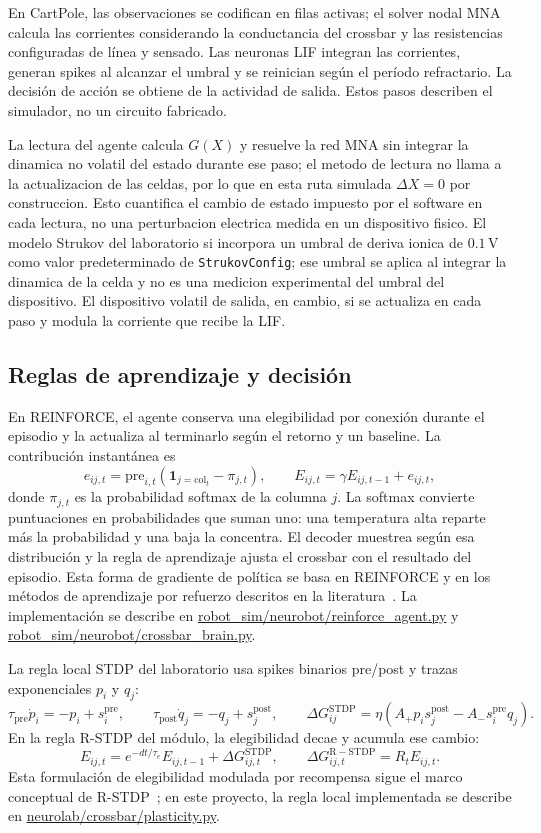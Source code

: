En CartPole, las observaciones se codifican en filas activas; el solver
nodal MNA calcula las corrientes considerando la conductancia del crossbar
y las resistencias configuradas de l\'inea y sensado. Las neuronas LIF
integran las corrientes, generan spikes al alcanzar el umbral y se reinician
seg\'un el per\'iodo refractario. La decisi\'on de acci\'on se obtiene de la
actividad de salida. Estos pasos describen el simulador, no un circuito
fabricado.

La lectura del agente calcula $G(X)$ y resuelve la red MNA sin integrar la
dinamica no volatil del estado durante ese paso; el metodo de lectura no
llama a la actualizacion de las celdas, por lo que en esta ruta simulada
$\Delta X=0$ por construccion. Esto cuantifica el cambio de estado impuesto
por el software en cada lectura, no una perturbacion electrica medida en un
dispositivo fisico. El modelo Strukov del laboratorio si incorpora un
umbral de deriva ionica de $0.1\,\mathrm{V}$ como valor predeterminado
de \texttt{StrukovConfig}; ese umbral se aplica al integrar la dinamica de la celda y no es una medicion
experimental del umbral del dispositivo. El dispositivo volatil de salida,
en cambio, si se actualiza en cada paso y modula la corriente que recibe
la LIF.

\subsection{Reglas de aprendizaje y decisi\'on}

En REINFORCE, el agente conserva una elegibilidad por conexi\'on durante el
episodio y la actualiza al terminarlo seg\'un el retorno y un baseline. La
contribuci\'on instant\'anea es
\[
e_{ij,t}=\mathrm{pre}_{i,t}
\left(\mathbf{1}_{j=\mathrm{col}_t}-\pi_{j,t}\right),\qquad
E_{ij,t}=\gamma E_{ij,t-1}+e_{ij,t},
\]
donde $\pi_{j,t}$ es la probabilidad softmax de la columna $j$. La softmax
convierte puntuaciones en probabilidades que suman uno: una temperatura alta
reparte m\'as la probabilidad y una baja la concentra. El decoder muestrea
seg\'un esa distribuci\'on y la regla de aprendizaje ajusta el crossbar con el
resultado del episodio. Esta forma de gradiente de pol\'itica se basa en REINFORCE y en los m\'etodos
de aprendizaje por refuerzo descritos en la literatura~\cite{Williams1992REINFORCE,SuttonBarto2018}. La implementaci\'on se describe en
\url{robot_sim/neurobot/reinforce_agent.py} y
\url{robot_sim/neurobot/crossbar_brain.py}.

La regla local STDP del laboratorio usa spikes binarios pre/post y trazas
exponenciales $p_i$ y $q_j$:
\[
\tau_{\mathrm{pre}}\dot p_i=-p_i+s_i^{\mathrm{pre}},\qquad
\tau_{\mathrm{post}}\dot q_j=-q_j+s_j^{\mathrm{post}},\qquad
\Delta G_{ij}^{\mathrm{STDP}}=\eta\left(A_+p_i s_j^{\mathrm{post}}
-A_-s_i^{\mathrm{pre}}q_j\right).
\]
En la regla R-STDP del m\'odulo, la elegibilidad decae y acumula ese cambio:
\[
E_{ij,t}=e^{-dt/\tau_e}E_{ij,t-1}+\Delta G_{ij,t}^{\mathrm{STDP}},
\qquad \Delta G_{ij,t}^{\mathrm{R-STDP}}=R_tE_{ij,t}.
\]
Esta formulaci\'on de elegibilidad modulada por recompensa sigue el marco
conceptual de R-STDP~\cite{Izhikevich2007RSTD}; en este proyecto, la regla
local implementada se describe en \url{neurolab/crossbar/plasticity.py}.


